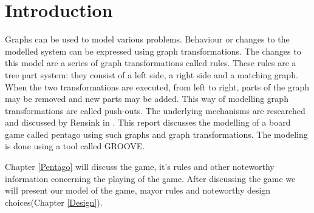 \section{Introduction}
\label{Introduction}
Graphs can be used to model various problems.
Behaviour or changes to the modelled system can be expressed using graph transformations.
The changes to this model are a series of graph transformations called rules.
These rules are a tree part system: they consist of a left side, a right side and a matching graph.
When the two transformations are executed, from left to right, parts of the graph may be removed and new parts may be added.
This way of modelling graph transformations are called push-outs.
The underlying mechanisms are researched and discussed by Rensink in \cite{Rensink2006}.
This report discusses the modelling of a board game called pentago using such graphs and graph transformations. 
The modeling is done using a tool called GROOVE.

\vspace{6pt}

Chapter \ref{Pentago} will discuss the game, it's rules and other noteworthy information concerning the playing of the game. After discussing the game we will present our model of the game, mayor rules and noteworthy design choices(Chapter \ref{Design}).
